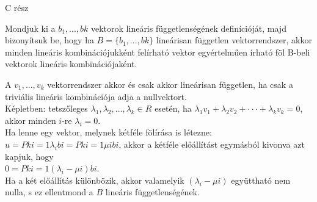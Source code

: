 \begin{frame}[plain]
\begin{tcolorbox}[center, colback={myyellow}, coltext={black}, colframe={myyellow}]
    {\RHuge C rész}
    \mmedskip
\end{tcolorbox}
\end{frame}

\begin{frame}
  \begin{tcolorbox}[title={1. (4p)}]
    Mondjuk ki a $b_1,...,bk$ vektorok lineáris függetlenségének definícióját, majd bizonyítsuk be, hogy ha $B = \{b_1,...,bk\}$ lineárisan független vektorrendszer, akkor minden lineáris kombinációjukként felírható vektor egyértelműen írható föl B-beli vektorok lineáris kombinációjaként.
  \tcblower
  
    A $v_1,...,v_k$ vektorrendszer akkor és csak akkor lineárisan független, ha csak a triviális lineáris kombinációja adja a nullvektort.\\

    Képletben: tetszőleges ${\lambda}_1,{\lambda}_2,...,{\lambda}_k \in R$ esetén, ha ${\lambda}_1v_1 + {\lambda}_2v_2 +  \cdot  \cdot  \cdot  + {\lambda}_kv_k = 0$, akkor minden $i$-re ${\lambda}_i = 0$.\\

    Ha lenne egy vektor, melynek kétféle fölírása is létezne: $u = Pk i=1 {\lambda}_ibi = Pk i=1 {\mu}ibi$, akkor a kétféle előállítást egymásból kivonva azt kapjuk, hogy\\

    $0 = Pk i=1({\lambda}_i -{\mu}i)bi$.\\

    Ha a két előállítás különbözik, akkor valamelyik $({\lambda}_i-{\mu}i)$ együttható nem nulla, s ez ellentmond a $B$ lineáris függetlenségének.
  \end{tcolorbox}
\end{frame}


